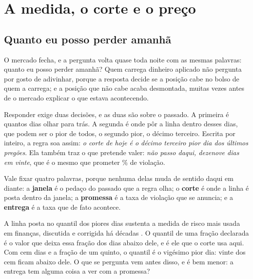 %
%

\chapter{A medida, o corte e o preço}
\label{cap:medida}

\section{Quanto eu posso perder amanhã}

O mercado fecha, e a pergunta volta quase toda noite com as mesmas palavras: quanto eu posso
perder amanhã? Quem carrega dinheiro aplicado não pergunta por gosto de adivinhar, porque a
resposta decide se a posição cabe no bolso de quem a carrega; e a posição que não cabe acaba
desmontada, muitas vezes antes de o mercado explicar o que estava acontecendo.

Responder exige duas decisões, e as duas são sobre o passado. A primeira é quantos dias olhar
para trás. A segunda é onde pôr a linha dentro desses dias, que podem ser o pior de todos, o
segundo pior, o décimo terceiro. Escrita por inteiro, a regra soa assim: \emph{o corte de hoje
é o décimo terceiro pior dia dos últimos \numCorteJanela{} pregões}. Ela também traz o que
pretende valer: \emph{não passo daqui, dezenove dias em vinte}, que é o mesmo que prometer
\numPromessaPct\% de violação.

Vale fixar quatro palavras, porque nenhuma delas muda de sentido daqui em diante: a
\textbf{janela} é o pedaço do passado que a regra olha; o \textbf{corte} é onde a linha é posta
dentro da janela; a \textbf{promessa} é a taxa de violação que se anuncia; e a \textbf{entrega}
é a taxa que de fato acontece.

A linha posta no quantil dos piores dias sustenta a medida de risco mais usada em finanças,
discutida e corrigida há décadas \cite{oconnell2026extreme}.
O quantil de uma fração declarada é o valor que deixa essa fração dos dias abaixo dele, e é ele
que o corte usa aqui. Com cem dias e a fração de um quinto, o quantil é o vigésimo pior dia:
vinte dos cem ficam abaixo dele. O que se pergunta vem antes disso, e é bem menor: a entrega tem
alguma coisa a ver com a promessa?

